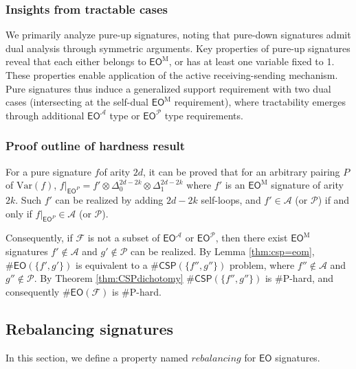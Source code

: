 \documentclass[a4paper,UKenglish,cleveref, autoref, thm-restate]{lipics-v2021}
\newcommand{\eo}[0]{\textsf{EO}}
\newcommand{\csp}[0]{\textsf{CSP}}
\newcommand{\eom}[1][\text{M}]{\textsf{EO}^{#1}}
\begin{document}
\subsubsection{Insights from tractable cases}
We primarily analyze pure-up signatures, noting that pure-down signatures admit dual analysis through symmetric arguments.
Key properties of pure-up signatures reveal that each either belongs to $\eom$, or has at least one variable fixed to 1.
These properties enable application of the active receiving-sending mechanism. Pure signatures thus induce a generalized support requirement with two dual cases (intersecting at the self-dual $\eom$ requirement), where tractability emerges through additional $\eom[\mathscr{A}]$ type or $\eom[\mathscr{P}]$ type requirements.



\subsubsection{Proof outline of hardness result}

For a pure signature $f$of arity $2d$, it can be proved that for an arbitrary pairing $P$ of $\text{Var}(f)$, $f|_{\eom[P]}=f'\otimes\Delta_0^{2d-2k}\otimes\Delta_1^{2d-2k}$ where $f'$ is an $\eom$ signature of arity $2k$. Such $f'$ can be realized by adding $2d-2k$ self-loops, and $f'\in \mathscr{A}$ (or $\mathscr{P}$) if and only if $f|_{\eom[P]}\in \mathscr{A}$ (or $\mathscr{P}$).

    Consequently, if $\mathcal{F}$ is not a subset of $\eom[\mathscr{A}]$ or $\eom[\mathscr{P}]$, then there exist $\eom$ signatures $f'\notin \mathscr{A}$ and $g'\notin \mathscr{P}$ can be realized.  By Lemma \ref{thm:csp=eom}, $\#\eo(\{f',g'\})$ is equivalent to a $\#\csp(\{f'',g''\})$ problem, where $f''\notin \mathscr{A}$ and $g''\notin \mathscr{P}$. By Theorem \ref{thm:CSPdichotomy} $\#\csp(\{f'',g''\})$ is \#P-hard, and consequently $\#\eo(\mathcal{F})$ is \#P-hard.
\subsection{Rebalancing signatures}\label{rererebl}
In this section, we define a property  named $rebalancing$ for $\eo$ signatures.
\end{document}
